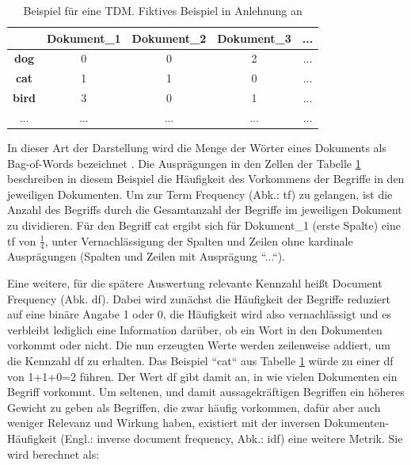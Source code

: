 \begin{table}[h]
\centering
\begin{tabular}{|c|c|c|c|c|}
\hline
\textbf{}     & \textbf{Dokument\_1} & \textbf{Dokument\_2} & \textbf{Dokument\_3} & \textbf{...} \\ \hline
\textbf{dog}  & 0                    & 0                    & 2                    & ...          \\ \hline
\textbf{cat}  & 1                    & 1                    & 0                    & ...          \\ \hline
\textbf{bird} & 3                    & 0                    & 1                    & ...          \\ \hline
...           & ...                  & ...                  & ...                  & ...          \\ \hline
\end{tabular}
\caption{Beispiel für eine TDM. Fiktives Beispiel in Anlehnung an \cite[S. 62]{Anandarajan}}
\label{tab:tdm}
\end{table}

In dieser Art der Darstellung wird die Menge der Wörter eines Dokuments als Bag-of-Words bezeichnet \cite[S. 46]{Anandarajan}. Die Ausprägungen in den Zellen der Tabelle \ref{tab:tdm} beschreiben in diesem Beispiel die Häufigkeit des Vorkommens der Begriffe in den jeweiligen Dokumenten. Um zur Term Frequency (Abk.: tf) zu gelangen, ist die Anzahl des Begriffs durch die Gesamtanzahl der Begriffe im jeweiligen Dokument zu dividieren. Für den Begriff cat ergibt sich für Dokument\_1 (erste Spalte) eine tf von \( \frac{1}{4} \), unter Vernachlässigung der Spalten und Zeilen ohne kardinale Ausprägungen (Spalten und Zeilen mit Ausprägung ``...``).

Eine weitere, für die spätere Auswertung relevante Kennzahl heißt Document Frequency (Abk. df). Dabei wird zunächst die Häufigkeit der Begriffe reduziert auf eine binäre Angabe 1 oder 0, die Häufigkeit wird also vernachlässigt und es verbleibt lediglich eine Information darüber, ob ein Wort in den Dokumenten vorkommt oder nicht. Die nun erzeugten Werte werden zeilenweise addiert, um die Kennzahl df zu erhalten. Das Beispiel ``cat`` aus Tabelle \ref{tab:tdm} würde zu einer df von 1+1+0=2 führen. Der Wert df gibt damit an, in wie vielen Dokumenten ein Begriff vorkommt. Um seltenen, und damit aussagekräftigen Begriffen ein höheres Gewicht zu geben als Begriffen, die zwar häufig vorkommen, dafür aber auch weniger Relevanz und Wirkung haben, existiert mit der inversen Dokumenten-Häufigkeit (Engl.: inverse document frequency, Abk.: idf) eine weitere Metrik. Sie wird berechnet als:

